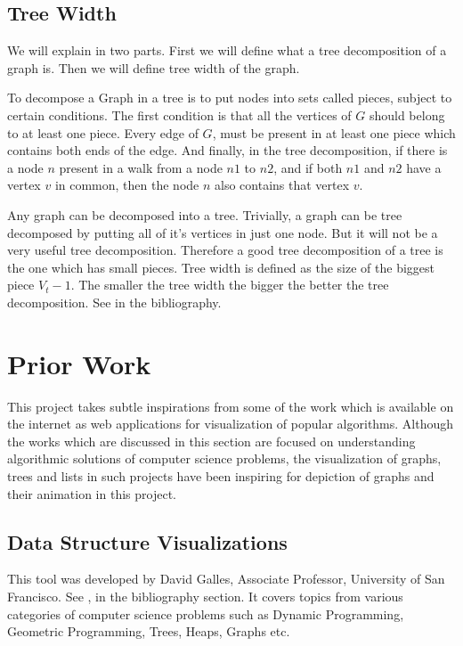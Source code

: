 \subsection{Tree Width}
We will explain in two parts. First we will define what a tree decomposition of
a graph is. Then we will define tree width of the graph.

To decompose a Graph in a tree is to put nodes into sets called pieces, subject
to certain conditions.  The first condition is that all the vertices of $G$
should belong to at least one piece. Every edge of $G$, must be present in
at least one piece which contains both ends of the edge.  And finally, in the
tree decomposition, if there is a node $n$ present in a walk from a node $n1$
to $n2$, and if both $n1$ and $n2$ have a vertex $v$ in common, then the node
$n$ also contains that vertex $v$. 

Any graph can be decomposed into a tree. Trivially, a graph can be tree
decomposed by putting all of it's vertices in just one node. But it will not be
a very useful tree decomposition.  Therefore a good tree decomposition of a
tree is the one which has small pieces.  Tree width is defined as the size of
the biggest piece $V_t - 1$. The smaller the tree width the bigger the better
the tree decomposition. See \cite{KleinbergTardos06} in the bibliography.

\section{Prior Work}
This project takes subtle inspirations from some of the work which is available
on the internet as web applications for visualization of popular algorithms.
Although the works which are discussed in this section are focused on
understanding algorithmic solutions of computer science problems, the
visualization of graphs, trees and lists in such projects have been inspiring
for depiction of graphs and their animation in this project.

\subsection{Data Structure Visualizations}
\label{priorWork: datastrucvisu}
This tool was developed by David Galles, Associate Professor, University of San
Francisco. See \cite{Galles}, in the bibliography section.  It covers topics
from various categories of computer science problems such as Dynamic
Programming, Geometric Programming, Trees, Heaps, Graphs etc.

